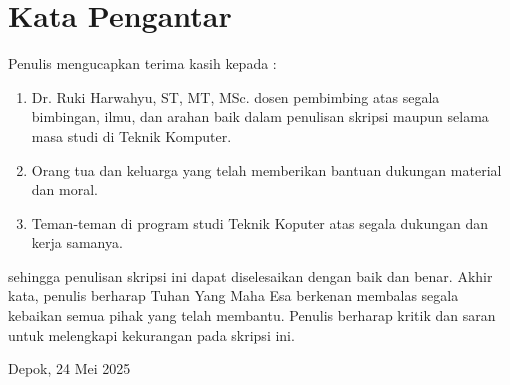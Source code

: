 \chapter*{Kata Pengantar}
Penulis mengucapkan terima kasih kepada :
\begin{enumerate}
  \item Dr. Ruki Harwahyu, ST, MT, MSc. dosen pembimbing atas segala bimbingan, ilmu, dan arahan baik dalam penulisan skripsi maupun selama masa studi di Teknik Komputer.
  \item Orang tua dan keluarga yang telah memberikan bantuan dukungan material dan moral.
  \item Teman-teman di program studi Teknik Koputer atas segala dukungan dan kerja samanya.
\end{enumerate}

sehingga penulisan skripsi ini dapat diselesaikan dengan baik dan benar. Akhir kata, penulis  berharap Tuhan Yang Maha Esa berkenan membalas segala kebaikan semua pihak yang telah membantu. Penulis berharap kritik dan saran untuk melengkapi kekurangan pada skripsi ini.

\vspace*{0.1cm}
\begin{flushright}
	Depok, 24 Mei 2025\\[0.1cm]
	\vspace*{1cm}
	\penulis

\end{flushright}

